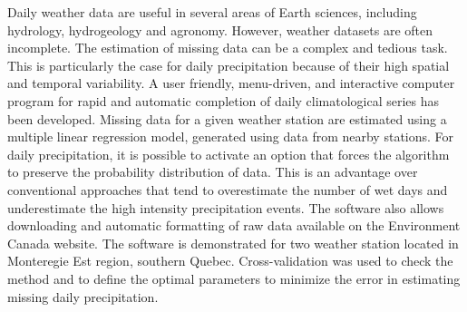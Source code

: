 \documentclass[TechnicalNoteMeteo.tex]{subfiles}
\begin{document}
\noindent 
Daily weather data are useful in several areas of Earth sciences, including hydrology, hydrogeology and agronomy. However, weather datasets are often incomplete. The estimation of missing data can be a complex and tedious task. This is particularly the case for daily precipitation because of their high spatial and temporal variability. A user friendly, menu-driven, and interactive computer program for rapid and automatic completion of daily climatological series has been developed. Missing data for a given weather station are estimated using a multiple linear regression model, generated using data from nearby stations. For daily precipitation, it is possible to activate an option that forces the algorithm to preserve the probability distribution of data. This is an advantage over conventional approaches that tend to overestimate the number of wet days and underestimate the high intensity precipitation events. The software also allows downloading and automatic formatting of raw data available on the Environment Canada website. The software is demonstrated for two weather station located in Monteregie Est region, southern Quebec. Cross-validation was used to check the method and to define the optimal parameters to minimize the error in estimating missing daily precipitation.
\end{document}

